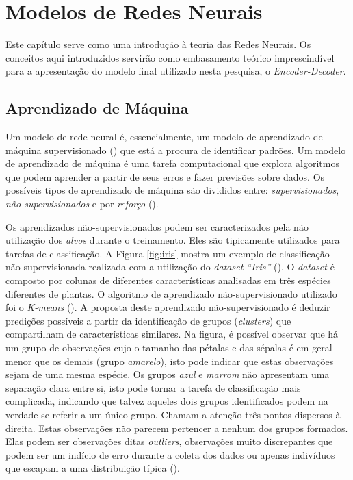 \chapter{Modelos de Redes Neurais}
\label{ch:03}



Este capítulo serve como uma introdução à teoria das Redes Neurais. Os conceitos aqui introduzidos servirão como embasamento teórico imprescindível para a apresentação do modelo final utilizado nesta pesquisa, o \textit{Encoder-Decoder}. 

\section{Aprendizado de Máquina}
\label{sec:ml}

Um modelo de rede neural é, essencialmente, um modelo de aprendizado de máquina supervisionado (\cite{Goodfellow-et-al-2016})
que está a procura de identificar padrões. Um modelo de aprendizado de máquina é uma tarefa computacional que explora algoritmos que podem aprender a partir de seus erros e fazer previsões sobre dados. Os possíveis tipos de aprendizado de máquina são divididos entre: \textit{supervisionados}, \textit{não-supervisionados}
e por \textit{reforço} (\cite{Gron:2017}). 

Os aprendizados não-supervisionados podem ser caracterizados pela não utilização dos \textit{alvos} durante o treinamento. Eles são tipicamente utilizados para tarefas de classificação. A Figura \ref{fig:iris} mostra um exemplo de classificação não-supervisionada realizada com a utilização do \textit{dataset “Iris”} (\cite{Dua:2019}). O \textit{dataset} é composto por colunas de diferentes características analisadas em três espécies diferentes de plantas. O algoritmo de aprendizado não-supervisionado utilizado foi o \textit{K-means} (\cite{Shalev-Shwartz:2014:UML:2621980}). A proposta deste aprendizado não-supervisionado é deduzir predições possíveis a partir da identificação de grupos (\textit{clusters}) que compartilham de características similares. Na figura, é possível observar que há um grupo de observações cujo o tamanho das pétalas e das sépalas é em geral menor que os demais (grupo \textit{amarelo}), isto pode indicar que estas observações sejam de uma mesma espécie. Os grupos \textit{azul} e \textit{marrom} não apresentam uma separação clara entre si, isto pode tornar a tarefa de classificação mais complicada, indicando que talvez aqueles dois grupos identificados podem na verdade se referir a um único grupo. Chamam a atenção três pontos dispersos à direita. Estas observações não parecem pertencer a nenhum dos grupos formados. Elas podem ser observações ditas \textit{outliers}, observações muito discrepantes que podem ser um indício de erro durante a coleta dos dados ou apenas indivíduos que escapam a uma distribuição típica (\cite{2004:bussab}). 


